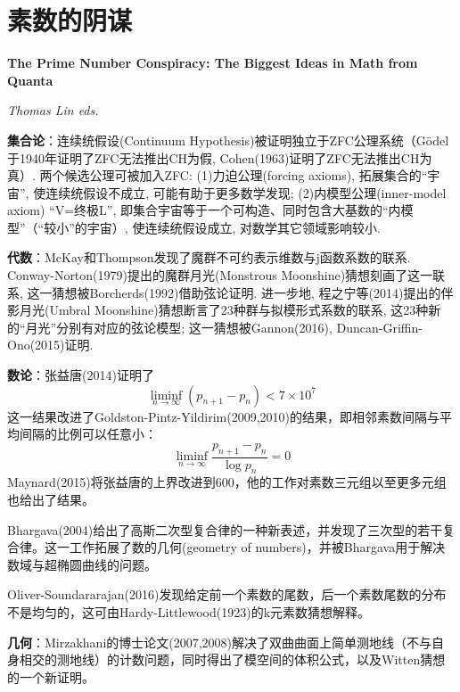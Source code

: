 \chapter{素数的阴谋}
\Large\textbf{The Prime Number Conspiracy: The Biggest Ideas in Math from Quanta}
\par \emph{Thomas Lin eds.} \normalsize

\par \textbf{集合论}：连续统假设(Continuum Hypothesis)被证明独立于ZFC公理系统（Gödel于1940年证明了ZFC无法推出CH为假, Cohen(1963)证明了ZFC无法推出CH为真）. 两个候选公理可被加入ZFC: (1)力迫公理(forcing axioms), 拓展集合的“宇宙”, 使连续统假设不成立, 可能有助于更多数学发现; (2)内模型公理(inner-model axiom) “V=终极L”, 即集合宇宙等于一个可构造、同时包含大基数的“内模型”（“较小”的宇宙）, 使连续统假设成立, 对数学其它领域影响较小. 

\par \textbf{代数}：McKay和Thompson发现了魔群不可约表示维数与j函数系数的联系. Conway-Norton(1979)提出的魔群月光(Monstrous Moonshine)猜想刻画了这一联系, 这一猜想被Borcherds(1992)借助弦论证明. 进一步地, 程之宁等(2014)提出的伴影月光(Umbral Moonshine)猜想断言了23种群与拟模形式系数的联系, 这23种新的“月光”分别有对应的弦论模型; 这一猜想被Gannon(2016), Duncan-Griffin-Ono(2015)证明. 

\par \textbf{数论}：张益唐(2014)证明了
\begin{equation*}
    \liminf\limits_{n\to \infty} (p_{n+1}-p_n)<7\times 10^7
\end{equation*}
这一结果改进了Goldston-Pintz-Yildirim(2009,2010)的结果，即相邻素数间隔与平均间隔的比例可以任意小：
\begin{equation*}
    \liminf\limits_{n\to \infty} \frac{p_{n+1}-p_n}{\log p_n}=0
\end{equation*}
Maynard(2015)将张益唐的上界改进到600，他的工作对素数三元组以至更多元组也给出了结果。

\par Bhargava(2004)给出了高斯二次型复合律的一种新表述，并发现了三次型的若干复合律。这一工作拓展了数的几何(geometry of numbers)，并被Bhargava用于解决数域与超椭圆曲线的问题。

\par Oliver-Soundararajan(2016)发现给定前一个素数的尾数，后一个素数尾数的分布不是均匀的，这可由Hardy-Littlewood(1923)的k元素数猜想解释。

\par \textbf{几何}：Mirzakhani的博士论文(2007,2008)解决了双曲曲面上简单测地线（不与自身相交的测地线）的计数问题，同时得出了模空间的体积公式，以及Witten猜想的一个新证明。

